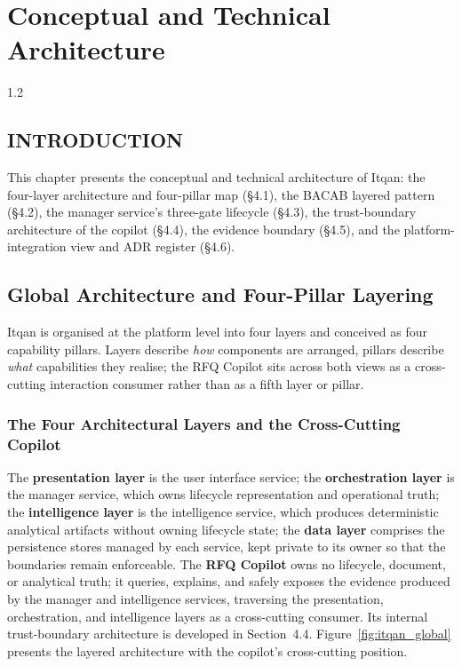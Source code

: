 \chapter{Conceptual and Technical Architecture}
\begin{spacing}{1.2}
\minitoc
\thispagestyle{MyStyle}
\end{spacing}
\newpage

\section*{INTRODUCTION}
This chapter presents the conceptual and technical architecture of Itqan: the four-layer architecture and four-pillar map (§4.1), the BACAB layered pattern (§4.2), the manager service's three-gate lifecycle (§4.3), the trust-boundary architecture of the copilot (§4.4), the evidence boundary (§4.5), and the platform-integration view and ADR register (§4.6).

\section{Global Architecture and Four-Pillar Layering}
Itqan is organised at the platform level into four layers and conceived as four capability pillars. Layers describe \textit{how} components are arranged, pillars describe \textit{what} capabilities they realise; the RFQ Copilot sits across both views as a cross-cutting interaction consumer rather than as a fifth layer or pillar.

\subsection{The Four Architectural Layers and the Cross-Cutting Copilot}
The \textbf{presentation layer} is the user interface service; the \textbf{orchestration layer} is the manager service, which owns lifecycle representation and operational truth; the \textbf{intelligence layer} is the intelligence service, which produces deterministic analytical artifacts without owning lifecycle state; the \textbf{data layer} comprises the persistence stores managed by each service, kept private to its owner so that the boundaries remain enforceable. The \textbf{RFQ Copilot} owns no lifecycle, document, or analytical truth; it queries, explains, and safely exposes the evidence produced by the manager and intelligence services, traversing the presentation, orchestration, and intelligence layers as a cross-cutting consumer. Its internal trust-boundary architecture is developed in Section~4.4. Figure~\ref{fig:itqan_global} presents the layered architecture with the copilot's cross-cutting position.

